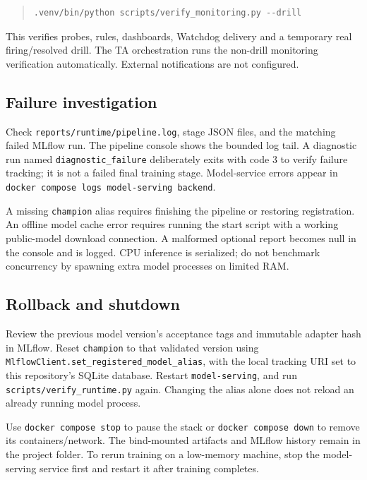 \documentclass[11pt,a4paper]{article}
\begin{document}
\begin{quote}\small
\begin{verbatim}
.venv/bin/python scripts/verify_monitoring.py --drill
\end{verbatim}
\end{quote}
This verifies probes, rules, dashboards, Watchdog delivery and a temporary real firing/resolved drill. The TA orchestration runs the non-drill monitoring verification automatically. External notifications are not configured.

\subsection*{Failure investigation}
Check \texttt{reports/\allowbreak{}runtime/\allowbreak{}pipeline.\allowbreak{}log}, stage JSON files, and the matching failed MLflow run. The pipeline console shows the bounded log tail. A diagnostic run named \texttt{diagnostic\_\allowbreak{}failure} deliberately exits with code 3 to verify failure tracking; it is not a failed final training stage. Model-service errors appear in \texttt{docker compose logs model-\allowbreak{}serving backend}.

A missing \texttt{champion} alias requires finishing the pipeline or restoring registration. An offline model cache error requires running the start script with a working public-model download connection. A malformed optional report becomes null in the console and is logged. CPU inference is serialized; do not benchmark concurrency by spawning extra model processes on limited RAM.

\subsection*{Rollback and shutdown}
Review the previous model version's acceptance tags and immutable adapter hash in MLflow. Reset \texttt{champion} to that validated version using \texttt{MlflowClient.\allowbreak{}set\_\allowbreak{}registered\_\allowbreak{}model\_\allowbreak{}alias}, with the local tracking URI set to this repository's SQLite database. Restart \texttt{model-\allowbreak{}serving}, and run \texttt{scripts/\allowbreak{}verify\_\allowbreak{}runtime.\allowbreak{}py} again. Changing the alias alone does not reload an already running model process.

Use \texttt{docker compose stop} to pause the stack or \texttt{docker compose down} to remove its containers/network. The bind-mounted artifacts and MLflow history remain in the project folder. To rerun training on a low-memory machine, stop the model-serving service first and restart it after training completes.
\end{document}
